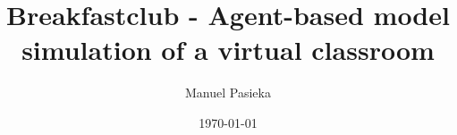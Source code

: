 \documentclass[11pt, a4paper, english]{book}
\title{Breakfastclub - Agent-based model simulation of a virtual classroom}
\author{Manuel Pasieka}
\date{\today}
\begin{document}
\renewcommand{\listfigurename}{Figures}
\renewcommand{\listtablename}{Tables}
\renewcommand{\contentsname}{Additional Content}
\renewcommand{\figurename}{Figura}
\renewcommand{\tablename}{Tabla} 

\newcommand{\bb}[1][5mm]{\vspace{#1}}

\maketitle

\frontmatter

\tableofcontents
\listoffigures
\listoftables

\setlength{\parindent}{0pt}



\mainmatter













 


\appendix


\end{document}
